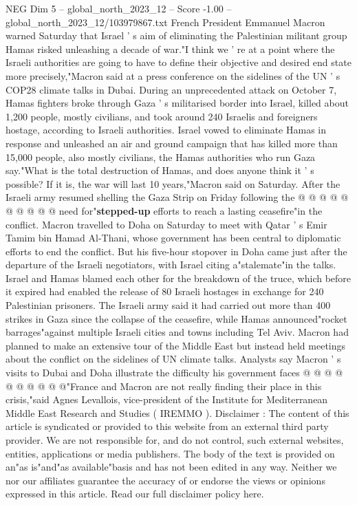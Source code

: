 \begin{textsample}{NEG Dim 5 – global\_north\_2023\_12 – Score -1.00 – global\_north\_2023\_12/103979867.txt}  \label{ex:f5_neg_057}
French President Emmanuel Macron warned Saturday that Israel ' s aim of eliminating the Palestinian militant group Hamas risked unleashing a decade of war."I think we ' re at a point where the Israeli authorities are going to have to define their objective and desired end state more precisely,"Macron said at a press conference on the sidelines of the UN ' s COP28 climate talks in Dubai.
During an unprecedented attack on October 7, Hamas fighters broke through Gaza ' s militarised border into Israel, killed about 1,200 people, mostly civilians, and took around 240 Israelis and foreigners hostage, according to Israeli authorities.
Israel vowed to eliminate Hamas in response and unleashed an air and ground campaign that has killed more than 15,000 people, also mostly civilians, the Hamas authorities who run Gaza say."What is the total destruction of Hamas, and does anyone think it ' s possible?
If it is, the war will last 10 years,"Macron said on Saturday.
After the Israeli army resumed shelling the Gaza Strip on Friday following the @ @ @ @ @ @ @ @ @ @ need for"\textbf{stepped-up} efforts to reach a lasting ceasefire"in the conflict.
Macron travelled to Doha on Saturday to meet with Qatar ' s Emir Tamim bin Hamad Al-Thani, whose government has been central to diplomatic efforts to end the conflict.
But his five-hour stopover in Doha came just after the departure of the Israeli negotiators, with Israel citing a"stalemate"in the talks.
Israel and Hamas blamed each other for the breakdown of the truce, which before it expired had enabled the release of 80 Israeli hostages in exchange for 240 Palestinian prisoners.
The Israeli army said it had carried out more than 400 strikes in Gaza since the collapse of the ceasefire, while Hamas announced"rocket barrages"against multiple Israeli cities and towns including Tel Aviv.
Macron had planned to make an extensive tour of the Middle East but instead held meetings about the conflict on the sidelines of UN climate talks.
Analysts say Macron ' s visits to Dubai and Doha illustrate the difficulty his government faces @ @ @ @ @ @ @ @ @ @"France and Macron are not really finding their place in this crisis,"said Agnes Levallois, vice-president of the Institute for Mediterranean Middle East Research and Studies ( IREMMO ).
Disclaimer : The content of this article is syndicated or provided to this website from an external third party provider.
We are not responsible for, and do not control, such external websites, entities, applications or media publishers.
The body of the text is provided on an"as is"and"as available"basis and has not been edited in any way.
Neither we nor our affiliates guarantee the accuracy of or endorse the views or opinions expressed in this article.
Read our full disclaimer policy here.

\end{textsample}
